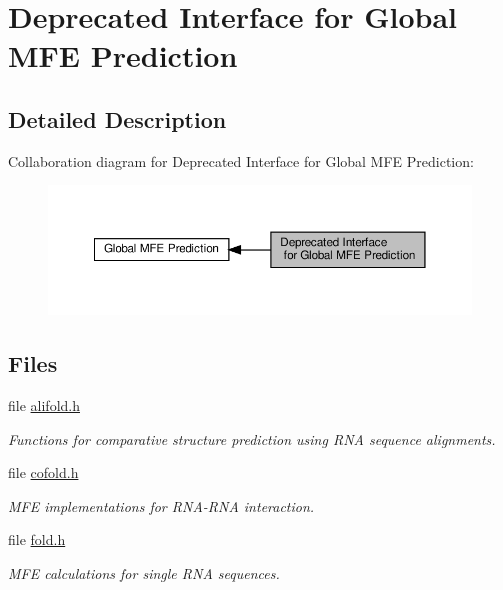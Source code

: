 \hypertarget{group__mfe__global__deprecated}{}\section{Deprecated Interface for Global M\+FE Prediction}
\label{group__mfe__global__deprecated}


\subsection{Detailed Description}
Collaboration diagram for Deprecated Interface for Global M\+FE Prediction\+:
\nopagebreak
\begin{figure}[H]
\begin{center}
\leavevmode
\includegraphics[width=350pt]{group__mfe__global__deprecated}
\end{center}
\end{figure}
\subsection*{Files}
\begin{DoxyCompactItemize}
\item 
file \hyperlink{alifold_8h}{alifold.\+h}
\begin{DoxyCompactList}\small\item\em Functions for comparative structure prediction using R\+NA sequence alignments. \end{DoxyCompactList}\item 
file \hyperlink{cofold_8h}{cofold.\+h}
\begin{DoxyCompactList}\small\item\em M\+FE implementations for R\+N\+A-\/\+R\+NA interaction. \end{DoxyCompactList}\item 
file \hyperlink{fold_8h}{fold.\+h}
\begin{DoxyCompactList}\small\item\em M\+FE calculations for single R\+NA sequences. \end{DoxyCompactList}\end{DoxyCompactItemize}
